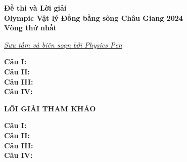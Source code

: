 \documentclass[12pt]{article}
\begin{document}
\thispagestyle{plain}

\begin{center}
  \LARGE{\textbf{Đề thi và Lời giải\\ Olympic Vật lý Đồng bằng sông Châu Giang 2024\\Vòng thứ nhất}}
\end{center}
\begin{center}
  \large\textit{\href{https://facebook.com}{Sưu tầm và biên soạn bởi Physics Pen}}
\end{center}

\vspace{1cm}

\noindent\textbf{Câu I:}\\


\noindent\textbf{Câu II:}\\


\noindent\textbf{Câu III:}\\


\noindent\textbf{Câu IV:}\\



\newpage

\begin{center}
  \Large{\textbf{LỜI GIẢI THAM KHẢO}}
\end{center}

\vspace{5mm}
\noindent\textbf{Câu I:}\\


\noindent\textbf{Câu II:}\\


\noindent\textbf{Câu III:}\\


\noindent\textbf{Câu IV:}\\

\end{document}
